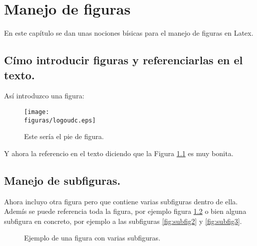 \chapter{Manejo de figuras}

En este capítulo se dan unas nociones bísicas para el manejo de figuras en Latex.

\section{Címo introducir figuras y referenciarlas en el texto.}

Así introduzco una figura:

\begin{figure}[H]
    \centerline{\texttt{[image: \\figuras/logoudc.eps]}}
    \label{fig:mifigura}\caption{Este sería el pie de figura.}
\end{figure}

Y ahora la referencio en el texto diciendo que la Figura \ref{fig:mifigura} es muy bonita.

\section{Manejo de subfiguras.}

Ahora incluyo otra figura pero que contiene varias subfiguras dentro de ella. Ademís se puede referencia toda la figura, por ejemplo figura \ref{fig:subfiguras} o bien alguna subfigura en concreto, por ejemplo a las subfiguras \ref{fig:subfig2} y \ref{fig:subfig3}.

%
\begin{figure}[H]
\begin{center}
    \hspace{1em} %
    \hspace{1em} %
    \caption{Ejemplo de una figura con varias subfiguras.}
    \label{fig:subfiguras}
\end{center}
\end{figure}

